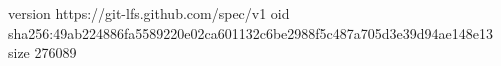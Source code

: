 version https://git-lfs.github.com/spec/v1
oid sha256:49ab224886fa5589220e02ca601132c6be2988f5c487a705d3e39d94ae148e13
size 276089
